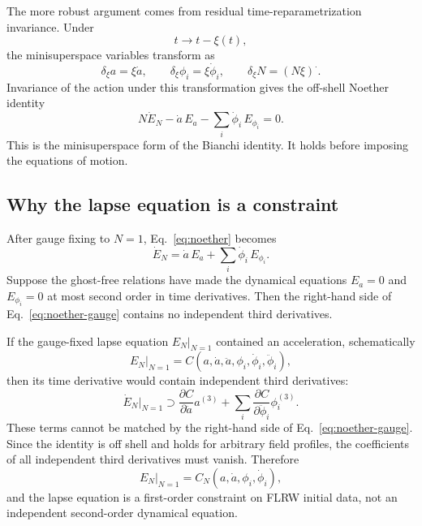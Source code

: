 \documentclass[aps,prd,twocolumn,superscriptaddress,nofootinbib,longbibliography]{revtex4-2}
\begin{document}
The more robust argument comes from residual time-reparametrization invariance.  Under
\begin{equation}
t\rightarrow t-\xi(t),
\end{equation}
the minisuperspace variables transform as
\begin{equation}
\delta_\xi a=\xi\dot a,\qquad
\delta_\xi\phi_i=\xi\dot\phi_i,\qquad
\delta_\xi N=(N\xi)^{\cdot}.
\label{eq:time-diffeo}
\end{equation}
Invariance of the action under this transformation gives the off-shell Noether identity
\begin{equation}
N\dot E_N-\dot a\,E_a-\sum_i\dot\phi_i\,E_{\phi_i}=0.
\label{eq:noether}
\end{equation}
This is the minisuperspace form of the Bianchi identity.  It holds before imposing the equations of motion.

\subsection{Why the lapse equation is a constraint}
\label{subsec:constraint-proof}

After gauge fixing to $N=1$, Eq.~\eqref{eq:noether} becomes
\begin{equation}
\dot E_N=\dot a\,E_a+\sum_i\dot\phi_i\,E_{\phi_i}.
\label{eq:noether-gauge}
\end{equation}
Suppose the ghost-free relations have made the dynamical equations $E_a=0$ and $E_{\phi_i}=0$ at most second order in time derivatives.  Then the right-hand side of Eq.~\eqref{eq:noether-gauge} contains no independent third derivatives.

If the gauge-fixed lapse equation $E_N|_{N=1}$ contained an acceleration, schematically
\begin{equation}
E_N|_{N=1}=C(a,\dot a,\ddot a,\phi_i,\dot\phi_i,\ddot\phi_i),
\end{equation}
then its time derivative would contain independent third derivatives:
\begin{equation}
\dot E_N|_{N=1}
\supset
\frac{\partial C}{\partial \ddot a}a^{(3)}
+\sum_i
\frac{\partial C}{\partial \ddot\phi_i}\phi_i^{(3)}.
\end{equation}
These terms cannot be matched by the right-hand side of Eq.~\eqref{eq:noether-gauge}.  Since the identity is off shell and holds for arbitrary field profiles, the coefficients of all independent third derivatives must vanish.  Therefore
\begin{equation}
E_N|_{N=1}=C_N(a,\dot a,\phi_i,\dot\phi_i),
\label{eq:first-order-constraint}
\end{equation}
and the lapse equation is a first-order constraint on FLRW initial data, not an independent second-order dynamical equation.
\end{document}
